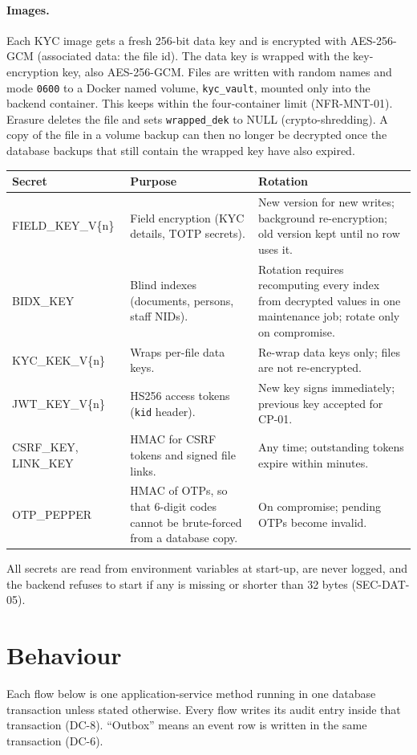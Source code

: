 \documentclass[11pt,a4paper]{article}
\newenvironment{dtable}[1]{\small\begin{longtable}{#1}}{\end{longtable}}
\begin{document}
\paragraph{Images.} Each KYC image gets a fresh 256-bit data key and is encrypted with AES-256-GCM (associated data: the file id). The data key is wrapped with the key-encryption key, also AES-256-GCM. Files are written with random names and mode \texttt{0600} to a Docker named volume, \texttt{kyc\_vault}, mounted only into the backend container. This keeps within the four-container limit (NFR-MNT-01). Erasure deletes the file and sets \texttt{wrapped\_dek} to NULL (crypto-shredding). A copy of the file in a volume backup can then no longer be decrypted once the database backups that still contain the wrapped key have also expired.

\begin{dtable}{@{}>{\ttfamily}p{3.3cm}>{\raggedright\arraybackslash}p{6.2cm}>{\raggedright\arraybackslash}p{5.7cm}@{}}
\toprule
\textnormal{\textbf{Secret}} & \textbf{Purpose} & \textbf{Rotation} \\ \midrule \endhead
FIELD\_KEY\_V\{n\} & Field encryption (KYC details, TOTP secrets). & New version for new writes; background re-encryption; old version kept until no row uses it. \\
BIDX\_KEY & Blind indexes (documents, persons, staff NIDs). & Rotation requires recomputing every index from decrypted values in one maintenance job; rotate only on compromise. \\
KYC\_KEK\_V\{n\} & Wraps per-file data keys. & Re-wrap data keys only; files are not re-encrypted. \\
JWT\_KEY\_V\{n\} & HS256 access tokens (\texttt{kid} header). & New key signs immediately; previous key accepted for CP-01. \\
CSRF\_KEY, LINK\_KEY & HMAC for CSRF tokens and signed file links. & Any time; outstanding tokens expire within minutes. \\
OTP\_PEPPER & HMAC of OTPs, so that 6-digit codes cannot be brute-forced from a database copy. & On compromise; pending OTPs become invalid. \\
\bottomrule
\end{dtable}
All secrets are read from environment variables at start-up, are never logged, and the backend refuses to start if any is missing or shorter than 32 bytes (SEC-DAT-05).
\section{Behaviour}
Each flow below is one application-service method running in one database transaction unless stated otherwise. Every flow writes its audit entry inside that transaction (DC-8). ``Outbox'' means an event row is written in the same transaction (DC-6).
\end{document}
